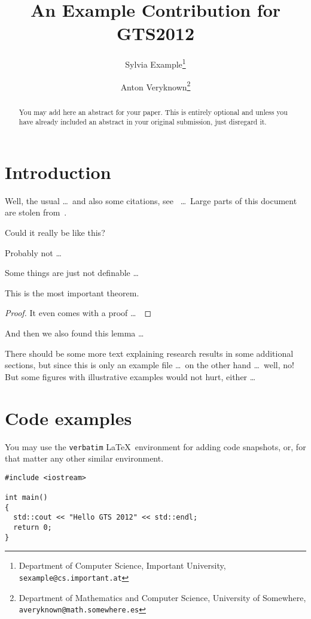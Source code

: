 \documentclass{gts2012}
\title{An Example Contribution for GTS2012}
\author{Sylvia Example\thanks{Department of Computer Science,
        Important University, {\tt sexample@cs.important.at}}
        \and
        Anton Veryknown\thanks{Department of Mathematics and Computer
        Science, University of Somewhere, {\tt averyknown@math.somewhere.es}}}
\begin{document}
\maketitle

\begin{abstract}
  You may add here an abstract for your paper. This is entirely
  optional and unless you have already included an abstract in your
  original submission, just disregard it.
\end{abstract}

\section{Introduction}

Well, the usual \ldots\ and also some citations, see~\cite{g-atpwog-2006}  \ldots\
Large parts of this document are stolen from~\cite{s-eef-2008}.

\begin{conj}
Could it really be like this?
\end{conj}
\begin{obs}
Probably not  \ldots\
\end{obs}

\begin{defini}
Some things are just not definable  \ldots\
\end{defini}

\begin{theorem}
This is the most important theorem.
\end{theorem}
\begin{proof}
It even comes with a proof  \ldots\
\end{proof}

\begin{lemma}
And then we also found this lemma  \ldots\
\end{lemma}

There should be some more text explaining research results in some
additional sections, but since this is only an example file \ldots\ on
the other hand \ldots\ well, no! But some figures with illustrative
examples would not hurt, either \ldots\


\section{Code examples}

You may use the \texttt{verbatim} \LaTeX\ environment for adding code
snapshots, or, for that matter any other similar environment.
\begin{verbatim}
#include <iostream>

int main()
{
  std::cout << "Hello GTS 2012" << std::endl;
  return 0;
}
\end{verbatim}
\end{document}

